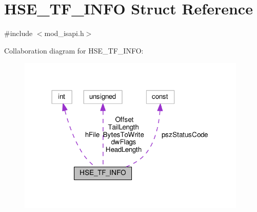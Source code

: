 \hypertarget{structHSE__TF__INFO}{}\section{H\+S\+E\+\_\+\+T\+F\+\_\+\+I\+N\+FO Struct Reference}
\label{structHSE__TF__INFO}


{\ttfamily \#include $<$mod\+\_\+isapi.\+h$>$}



Collaboration diagram for H\+S\+E\+\_\+\+T\+F\+\_\+\+I\+N\+FO\+:
\nopagebreak
\begin{figure}[H]
\begin{center}
\leavevmode
\includegraphics[width=309pt]{structHSE__TF__INFO__coll__graph}
\end{center}
\end{figure}
